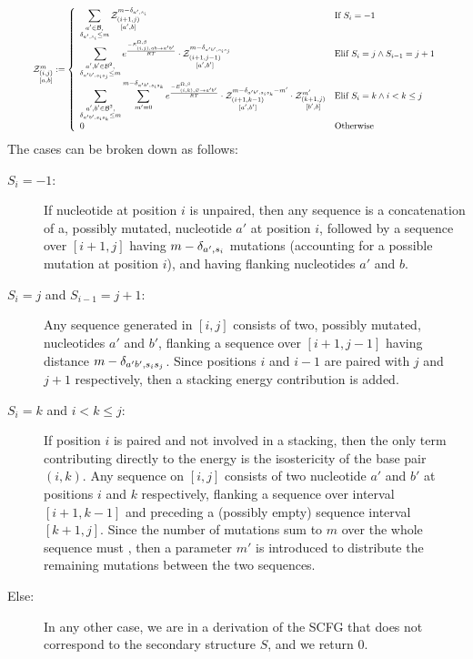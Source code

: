 \begin{equation}
\label{eq:Z_rec}
\resizebox{.93\textwidth}{!}{%
	$\Z{i,j}{m}{a,b}:=\left\{
  \begin{array}{ll}
  		\displaystyle
      \sum_{\substack{a'\in \B,\\ \Kron_{a',s_i}\le m}}  
      \Z{i+1,j}{m-\Kron_{a',s_i}}{a',b} & \text{If }S_{i}=-1\\
      \displaystyle
      \sum_{\substack{a',b'\in \B^2,\\ \Kron_{a'b',s_is_j}\le m}}
			 e^{\frac{-E_{(i,j),ab \to a'b'}^{\Omega,\beta}}{RT}}
			 \cdot \Z{i+1,j-1}{m-\Kron_{a'b',s_is_j}}{a',b'}&
			 \text{Elif }S_i=j \land S_{i-1}=j+1\\
			 \displaystyle
      \sum_{\substack{a',b'\in \B^2,\\ \Kron_{a'b',s_is_k}\le m}}
      \sum_{m'=0}^{m-\Kron_{a'b',s_is_k}}
   		 e^{\frac{-E_{(i,k),\varnothing\to a'b'}^{\Omega,\beta}}{RT}}
      \cdot\Z{i+1,k-1}{m-\Kron_{a'b',s_is_k}-m'}{a',b'}
      \cdot\Z{k+1,j}{m'}{b',b} & \text{Elif }S_i=k \land i < k \leq j\\
      0 &\text{Otherwise}
	\end{array}\right.$}
\end{equation}
The cases can be broken down as follows:
\begin{description}
\item[$S_{i}=-1$:] If nucleotide at position $i$ is unpaired, then 
any sequence is a concatenation of a, possibly mutated, nucleotide $a'$ at position  $i$, 
followed by a sequence over $[i+1,j]$ having $m-\delta_{a',s_i}$ mutations (accounting for a possible mutation 
at position $i$), and having flanking nucleotides $a'$ and $b$.
\item[$S_i=j$ and $S_{i-1}=j+1$:] Any sequence generated in $[i,j]$ consists of two, possibly mutated, nucleotides $a'$ and $b'$, flanking a sequence over $[i+1,j-1]$ having distance $m-\delta_{a'b',s_is_j}$.
Since positions $i$ and $i-1$ are paired with $j$ and $j+1$ respectively, 
then a stacking energy contribution is added. 
\item[$S_i=k$ and $i<k \leq j$:] If position $i$ is paired and not involved in a stacking, then the 
only term contributing directly to the energy is the isostericity of the base pair $(i,k)$. 
Any sequence on $[i,j]$ consists of two nucleotide $a'$ and $b'$ at positions $i$ and $k$ respectively, flanking a sequence over interval $[i+1,k-1]$ and preceding a (possibly empty) sequence interval $[k+1,j]$. Since the number of mutations sum to $m$ over the whole sequence must , then a parameter $m'$ is introduced to distribute the remaining mutations between the two sequences.
\item[Else:] In any other case, we are in a derivation of the SCFG that does not correspond to the secondary structure $S$, and we return $0$.
\end{description}

